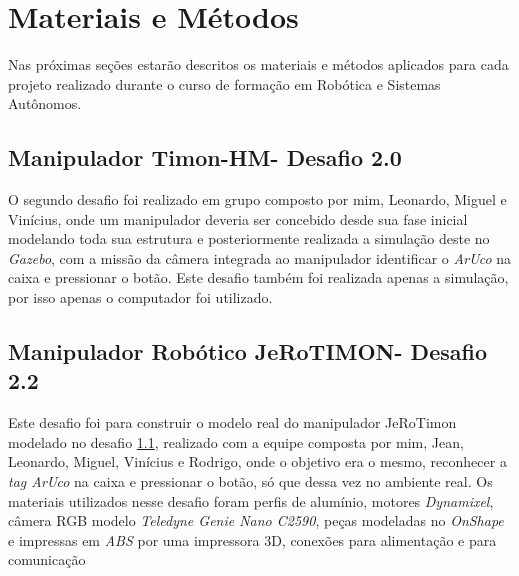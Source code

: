 \chapter{Materiais e Métodos}
\label{chap:mat}
Nas próximas seções estarão descritos os materiais e métodos aplicados para cada projeto realizado durante o curso de formação em Robótica e Sistemas Autônomos. 


\section{Manipulador Timon-HM- Desafio 2.0}
\label{sec:met_desafio2}
O segundo desafio foi realizado em grupo composto por mim, Leonardo, Miguel e Vinícius, onde um manipulador deveria ser concebido desde sua fase inicial modelando toda sua estrutura e posteriormente realizada a simulação deste no \textit{Gazebo}, com a missão da câmera integrada ao manipulador identificar o \textit{ArUco} na caixa e pressionar o botão. Este desafio também foi realizada apenas a simulação, por isso apenas o computador foi utilizado.  

\section{Manipulador Robótico JeRoTIMON- Desafio 2.2 }
\label{sec:met_desafio2_2}
Este desafio foi para construir o modelo real do manipulador JeRoTimon modelado no desafio \ref{sec:met_desafio2}, realizado com a equipe composta por mim, Jean, Leonardo, Miguel, Vinícius e Rodrigo, onde o objetivo era o mesmo, reconhecer a \textit{tag ArUco} na caixa e pressionar o botão, só que dessa vez no ambiente real. Os materiais utilizados nesse desafio foram perfis de alumínio, motores \textit{Dynamixel}, câmera RGB modelo \textit{Teledyne Genie Nano C2590},  peças modeladas no \textit{OnShape} e impressas em \textit{ABS} por uma impressora 3D, conexões para alimentação e para comunicação

